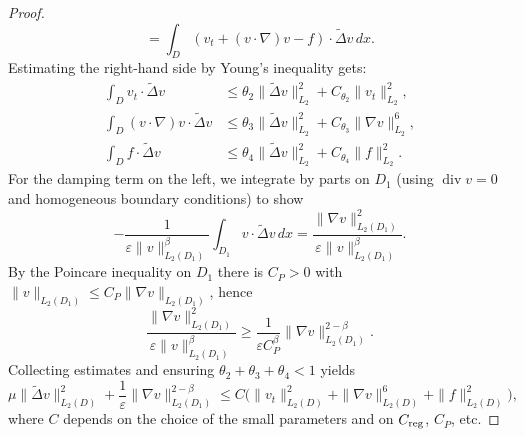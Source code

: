 \documentclass[11pt]{article}
\begin{document}
\begin{proof}
\[	= \int_D (v_t+(v\cdot\nabla)v-f)\cdot\tilde\Delta v\,dx.
	\]
	Estimating the right-hand side by Young's inequality gets:
	\[
	\begin{aligned}
		\int_D v_t\cdot\tilde\Delta v &\le \theta_2\|\tilde\Delta v\|_{L_2}^2 + C_{\theta_2}\|v_t\|_{L_2}^2,\\
		\int_D (v\cdot\nabla)v\cdot\tilde\Delta v &\le \theta_3\|\tilde\Delta v\|_{L_2}^2 + C_{\theta_3}\|\nabla v\|_{L_2}^6,\\
		\int_D f\cdot\tilde\Delta v &\le \theta_4\|\tilde\Delta v\|_{L_2}^2 + C_{\theta_4}\|f\|_{L_2}^2.
	\end{aligned}
	\]
	For the damping term on the left, we integrate by parts on $D_1$ (using $\operatorname{div}v=0$ and homogeneous boundary conditions) to show
	\[
	-\frac{1}{\varepsilon\|v\|_{L_2(D_1)}^\beta}\int_{D_1} v\cdot\tilde\Delta v\,dx
	= \frac{\|\nabla v\|_{L_2(D_1)}^2}{\varepsilon\|v\|_{L_2(D_1)}^\beta}.
	\]
	By the Poincare inequality on $D_1$ there is $C_P>0$ with $\|v\|_{L_2(D_1)}\le C_P\|\nabla v\|_{L_2(D_1)}$, hence
	\[
	\frac{\|\nabla v\|_{L_2(D_1)}^2}{\varepsilon\|v\|_{L_2(D_1)}^\beta}
	\ge \frac{1}{\varepsilon C_P^\beta}\|\nabla v\|_{L_2(D_1)}^{2-\beta}.
	\]
	Collecting estimates and ensuring $\theta_2+\theta_3+\theta_4<1$ yields
	\begin{equation}\label{St 19}
		{\mu}\|\tilde\Delta v\|_{L_2(D)}^2 + \frac{1}{\varepsilon}\|\nabla v\|_{L_2(D_1)}^{2-\beta}
		\le C\big(\|v_t\|_{L_2(D)}^2 + \|\nabla v\|_{L_2(D)}^6 + \|f\|_{L_2(D)}^2\big),
	\end{equation}
	where $C$ depends on the choice of the small parameters and on $C_{\rm reg}$, $C_P$, etc.
	

\end{proof}
\end{document}
